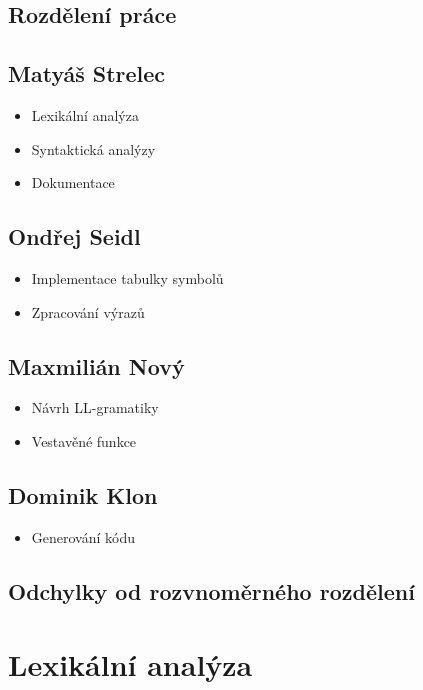 \documentclass[11pt,a4paper]{article}
\begin{document}
    \subsection{Rozdělení práce}

    \subsection*{Matyáš Strelec}
    \begin{itemize}
        \item Lexikální analýza
        \item Syntaktická analýzy
        \item Dokumentace
    \end{itemize}

    \subsection*{Ondřej Seidl}
    \begin{itemize}
        \item Implementace tabulky symbolů
        \item Zpracování výrazů
    \end{itemize}

    \subsection*{Maxmilián Nový}
    \begin{itemize}
        \item Návrh LL-gramatiky
        \item Vestavěné funkce
    \end{itemize}

    \subsection*{Dominik Klon}
    \begin{itemize}
        \item Generování kódu
    \end{itemize}

    \subsection{Odchylky od rozvnoměrného rozdělení}
    

    \pagebreak{}

    \section{Lexikální analýza}
\end{document}
